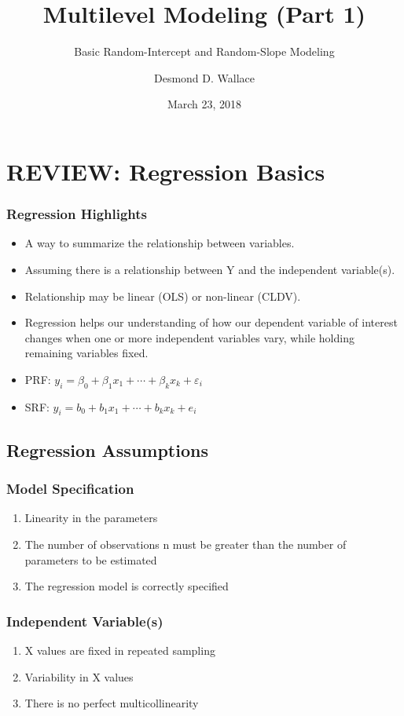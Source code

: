 \documentclass{beamer}
\title[MLM I]{Multilevel Modeling (Part 1)}
\subtitle[ISRC Workshop]{Basic Random-Intercept and Random-Slope Modeling}
\author[Wallace]{Desmond D. Wallace}
\institute[University of Iowa]{Department of Political Science\\The University of Iowa\\Iowa City, IA}
\date{March 23, 2018}
\begin{document}
\begin{frame}
	\titlepage
\end{frame}


\section{REVIEW: Regression Basics}

\begin{frame}
	\frametitle{Regression Highlights}
	\begin{itemize}
		\item A way to summarize the relationship between variables.
		\item Assuming there is a relationship between Y and the independent variable(s).
		\item Relationship may be linear (OLS) or non-linear (CLDV).
		\item Regression helps our understanding of how our dependent variable of interest changes when one or more independent variables vary, while holding remaining variables fixed.
		\item PRF: $y_{i}=\beta_{0}+\beta_{1}x_{1}+\cdots+\beta_{k}x_{k}+\varepsilon_{i}$
		\item SRF: $y_{i}=b_{0}+b_{1}x_{1}+\cdots+b_{k}x_{k}+e_{i}$
	\end{itemize}
\end{frame}

\subsection{Regression Assumptions}

\begin{frame}
	\frametitle{Model Specification}
		\begin{enumerate}
			\item Linearity in the parameters
			\item The number of observations n must be greater than the number of
			parameters to be estimated
			\item The regression model is correctly specified
		\end{enumerate}
\end{frame}

\begin{frame}
	\frametitle{Independent Variable(s)}
		\begin{enumerate}
			\item X values are fixed in repeated sampling
			\item Variability in X values
			\item There is no perfect multicollinearity
		\end{enumerate}
\end{frame}
\end{document}
